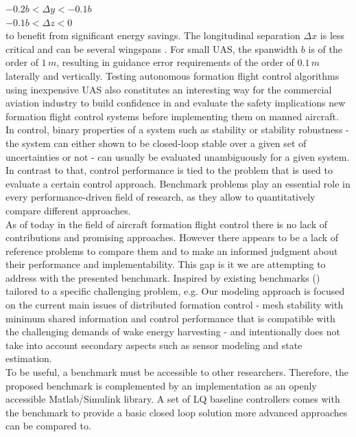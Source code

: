 \documentclass{ifacconf}
\begin{document}
{
\centering
$-0.2 b < \Delta y < -0.1 b$ \\
$-0.1 b < \Delta z < 0$ \\
}
\noindent
to benefit from significant energy savings. The longitudinal separation $\Delta x$ is less critical and can be several wingspans \cite{jake2003f}. For small UAS, the spanwidth $b$ is of the order of $1 \, m$, resulting in guidance error requirements of the order of $0.1 \, m$ laterally and vertically.
%
Testing autonomous formation flight control algorithms using inexpensive UAS also constitutes an interesting way for the commercial aviation industry to build confidence in and evaluate the safety implications new formation flight control systems before implementing them on manned aircraft.\\
In control, binary properties of a system such as stability or stability robustness - the system can either shown to be closed-loop stable over a given set of uncertainties or not - can usually be evaluated unambiguously for a given system. In contrast to that, control performance is tied to the problem that is used to evaluate a certain control approach. 
Benchmark problems play an essential role in every performance-driven field of research, as they allow to quantitatively compare different approaches. \\
As of today in the field of aircraft formation flight control there is no lack of contributions and promising approaches. However there appears to be a lack of reference problems to compare them and to make an informed judgment about their performance and implementability. This gap is it we are attempting to address with the presented benchmark. Inspired by existing benchmarks (\cite{biannic2015flare}) tailored to a specific challenging problem, e.g. Our modeling approach is focused on the current main issues of distributed formation control - mesh stability with minimum shared information and control performance that is compatible with the challenging demands of wake energy harvesting - and intentionally does not take into account secondary aspects such as sensor modeling and state estimation.\\
To be useful, a benchmark must be accessible to other researchers. Therefore, the proposed benchmark is complemented by an implementation as an openly accessible Matlab/Simulink library. A set of LQ baseline controllers comes with the benchmark to provide a basic closed loop solution more advanced approaches can be compared to.
\end{document}
